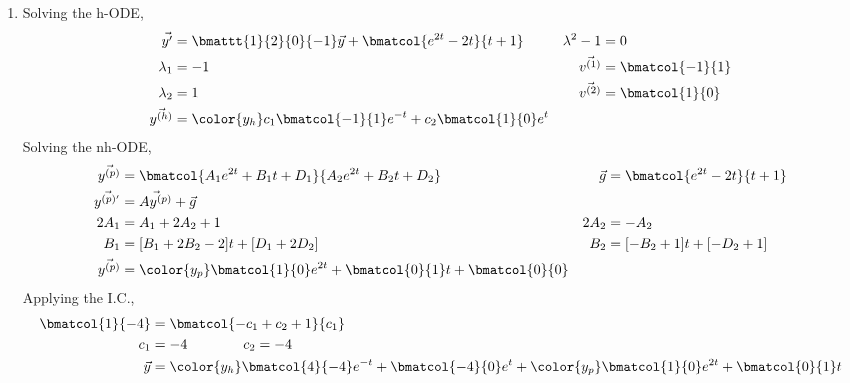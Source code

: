 \begin{enumerate}
    \item Solving the h-ODE,
          \begin{align}
              \vec{y'}                       & = \bmattt{1}{2}{0}{-1} \vec{y}
              + \bmatcol{e^{2t} - 2t}{t + 1} &
              \lambda^{2} - 1                & = 0                              \\
              \lambda_1                      & = -1                           &
              \vec{v^{(1)}}                  & = \bmatcol{-1}{1}                \\
              \lambda_2                      & = 1                            &
              \vec{v^{(2)}}                  & = \bmatcol{1}{0}                 \\
              \vec{y^{(h)}}                  & = \color{y_h}
              c_1 \bmatcol{-1}{1}e^{-t} + c_2 \bmatcol{1}{0} e^{t}
          \end{align}
          Solving the nh-ODE,
          \begin{align}
              \vec{y^{(p)}}              & = \bmatcol{A_1 e^{2t} + B_1 t + D_1}
              {A_2 e^{2t} + B_2 t + D_2} &
              \vec{g}                    & = \bmatcol{e^{2t} - 2t}{t + 1}         \\
              \vec{y^{(p)'}}             & = \vec{Ay^{(p)}} + \vec{g}             \\
              2A_1                       & =  A_1 + 2A_2 + 1                    &
              2A_2                       & =  -A_2                                \\
              B_1                        & =  [B_1 + 2B_2 - 2] t + [D_1 + 2D_2] &
              B_2                        & =  [-B_2 + 1] t + [-D_2 + 1]           \\
              \vec{y^{(p)}}              & = \color{y_p} \bmatcol{1}{0}e^{2t}
              + \bmatcol{0}{1}t + \bmatcol{0}{0}
          \end{align}
          Applying the I.C.,
          \begin{align}
              \bmatcol{1}{-4} & = \bmatcol{-c_1 + c_2 + 1}{c_1} \\
              c_1             & = -4 \qquad\qquad c_2 = -4      \\
              \vec{y}         & = {\color{y_h}
              \bmatcol{4}{-4}e^{-t} + \bmatcol{-4}{0} e^{t}}
              + {\color{y_p} \bmatcol{1}{0}e^{2t}
              + \bmatcol{0}{1}t}
          \end{align}


\end{enumerate}
